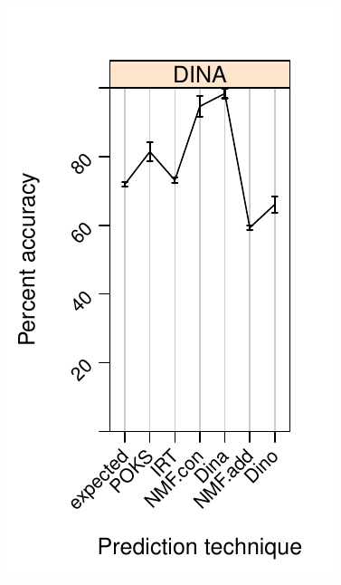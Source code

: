 \documentclass{beamer}
\begin{document}
\begin{frame}
\begin{overprint}
		\begin{columns}
		\begin{column}{0.5\textwidth}
		 \vspace{1.25cm}   
   \includegraphics[trim=0cm 0cm 0cm 1.5cm,clip=true,scale =0.55] {images/Predictive-Preformace_Sig.pdf}

\end{column}
\end{columns}
\end{overprint}
\end{frame}
\end{document}
